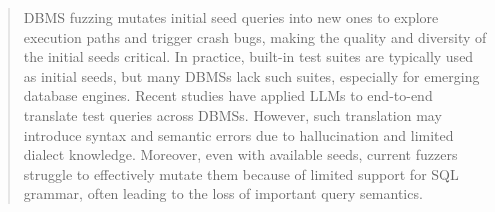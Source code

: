 \documentclass[sigconf,review,anonymous]{acmart}
\begin{document}
\begin{abstract}

DBMS fuzzing mutates initial seed queries into new ones to explore execution paths and trigger crash bugs, making the quality and diversity of the initial seeds critical.
In practice, built-in test suites are typically used as initial seeds, but many DBMSs lack such suites, especially for emerging database engines. 
Recent studies have applied LLMs to end-to-end translate test queries across DBMSs. However, such translation may introduce syntax and semantic errors due to hallucination and limited dialect knowledge. 
Moreover, even with available seeds, current fuzzers struggle to effectively mutate them because of limited support for SQL grammar, often leading to the loss of important query semantics.



\end{abstract}
\end{document}
